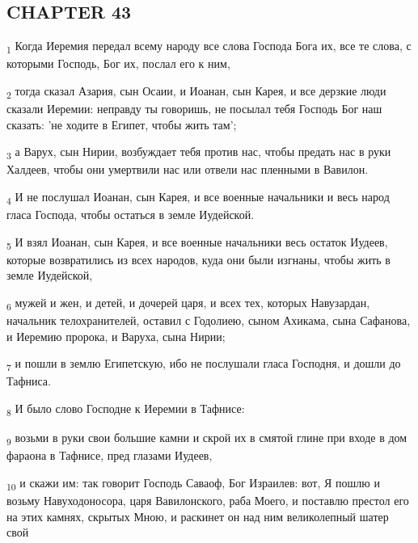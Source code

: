 \subsection{CHAPTER 43}
\begin{tcolorbox}
\textsubscript{1} Когда Иеремия передал всему народу все слова Господа Бога их, все те слова, с которыми Господь, Бог их, послал его к ним,
\end{tcolorbox}
\begin{tcolorbox}
\textsubscript{2} тогда сказал Азария, сын Осаии, и Иоанан, сын Карея, и все дерзкие люди сказали Иеремии: неправду ты говоришь, не посылал тебя Господь Бог наш сказать: 'не ходите в Египет, чтобы жить там';
\end{tcolorbox}
\begin{tcolorbox}
\textsubscript{3} а Варух, сын Нирии, возбуждает тебя против нас, чтобы предать нас в руки Халдеев, чтобы они умертвили нас или отвели нас пленными в Вавилон.
\end{tcolorbox}
\begin{tcolorbox}
\textsubscript{4} И не послушал Иоанан, сын Карея, и все военные начальники и весь народ гласа Господа, чтобы остаться в земле Иудейской.
\end{tcolorbox}
\begin{tcolorbox}
\textsubscript{5} И взял Иоанан, сын Карея, и все военные начальники весь остаток Иудеев, которые возвратились из всех народов, куда они были изгнаны, чтобы жить в земле Иудейской,
\end{tcolorbox}
\begin{tcolorbox}
\textsubscript{6} мужей и жен, и детей, и дочерей царя, и всех тех, которых Навузардан, начальник телохранителей, оставил с Годолиею, сыном Ахикама, сына Сафанова, и Иеремию пророка, и Варуха, сына Нирии;
\end{tcolorbox}
\begin{tcolorbox}
\textsubscript{7} и пошли в землю Египетскую, ибо не послушали гласа Господня, и дошли до Тафниса.
\end{tcolorbox}
\begin{tcolorbox}
\textsubscript{8} И было слово Господне к Иеремии в Тафнисе:
\end{tcolorbox}
\begin{tcolorbox}
\textsubscript{9} возьми в руки свои большие камни и скрой их в смятой глине при входе в дом фараона в Тафнисе, пред глазами Иудеев,
\end{tcolorbox}
\begin{tcolorbox}
\textsubscript{10} и скажи им: так говорит Господь Саваоф, Бог Израилев: вот, Я пошлю и возьму Навуходоносора, царя Вавилонского, раба Моего, и поставлю престол его на этих камнях, скрытых Мною, и раскинет он над ним великолепный шатер свой
\end{tcolorbox}
